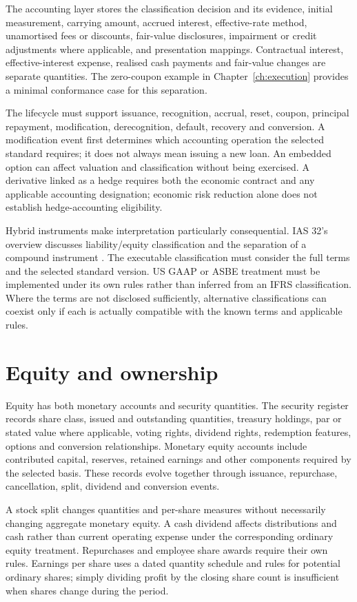 The accounting layer stores the classification decision and its evidence,
initial measurement, carrying amount, accrued interest, effective-rate method,
unamortised fees or discounts, fair-value disclosures, impairment or credit
adjustments where applicable, and presentation mappings. Contractual interest,
effective-interest expense, realised cash payments and fair-value changes are
separate quantities. The zero-coupon example in Chapter~\ref{ch:execution}
provides a minimal conformance case for this separation.

The lifecycle must support issuance, recognition, accrual, reset, coupon,
principal repayment, modification, derecognition, default, recovery and
conversion. A modification event first determines which accounting operation
the selected standard requires; it does not always mean issuing a new loan.
An embedded option can affect valuation and classification without being
exercised. A derivative linked as a hedge requires both the economic contract
and any applicable accounting designation; economic risk reduction alone does
not establish hedge-accounting eligibility.

Hybrid instruments make interpretation particularly consequential. IAS 32's
overview discusses liability/equity classification and the separation of a
compound instrument \citep{ias32}. The executable classification must consider
the full terms and the selected standard version. US GAAP or ASBE treatment
must be implemented under its own rules rather than inferred from an IFRS
classification. Where the terms are not disclosed sufficiently, alternative
classifications can coexist only if each is actually compatible with the
known terms and applicable rules.

\section{Equity and ownership}

Equity has both monetary accounts and security quantities. The security
register records share class, issued and outstanding quantities, treasury
holdings, par or stated value where applicable, voting rights, dividend rights,
redemption features, options and conversion relationships. Monetary equity
accounts include contributed capital, reserves, retained earnings and other
components required by the selected basis. These records evolve together
through issuance, repurchase, cancellation, split, dividend and conversion
events.

A stock split changes quantities and per-share measures without necessarily
changing aggregate monetary equity. A cash dividend affects distributions and
cash rather than current operating expense under the corresponding ordinary
equity treatment. Repurchases and employee share awards require their own
rules. Earnings per share uses a dated quantity schedule and rules for potential
ordinary shares; simply dividing profit by the closing share count is
insufficient when shares change during the period.

